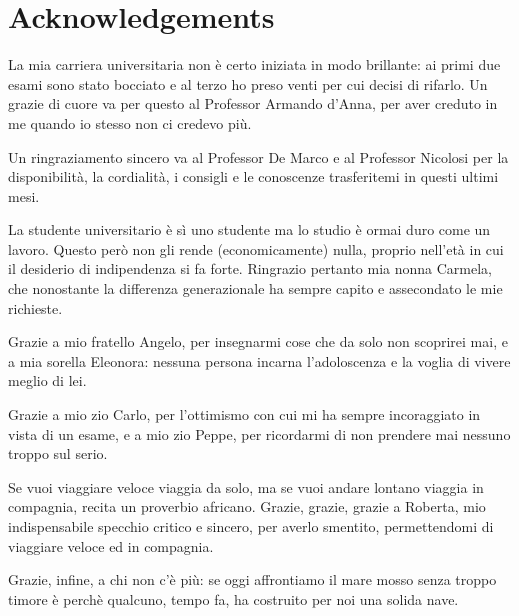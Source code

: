 %
%
%
%
%
\chapter{Acknowledgements}

La mia carriera universitaria non è certo iniziata in modo brillante: ai primi due esami sono stato bocciato e al terzo ho preso venti per cui decisi di rifarlo. Un grazie di cuore va per questo al Professor Armando d'Anna, per aver creduto in me quando io stesso non ci credevo più.

\bigskip
\noindent
Un ringraziamento sincero va al Professor De Marco e al Professor Nicolosi per la disponibilità, la cordialità, i consigli e le conoscenze trasferitemi in questi ultimi mesi.

\bigskip
\noindent
La studente universitario è sì uno studente ma lo studio è ormai duro come un lavoro. Questo però non gli rende (economicamente) nulla, proprio nell'età in cui il desiderio di indipendenza si fa forte. Ringrazio pertanto mia nonna Carmela, che nonostante la differenza generazionale ha sempre capito e assecondato le mie richieste.

\bigskip
\noindent
Grazie a mio fratello Angelo, per insegnarmi cose che da solo non scoprirei mai, e a mia sorella Eleonora: nessuna persona incarna l'adoloscenza e la voglia di vivere meglio di lei.

\bigskip
\noindent
Grazie a mio zio Carlo, per l'ottimismo con cui mi ha sempre incoraggiato in vista di un esame, e a mio zio Peppe, per ricordarmi di non prendere mai nessuno troppo sul serio.

\bigskip
\noindent
Se vuoi viaggiare veloce viaggia da solo, ma se vuoi andare lontano viaggia in compagnia, recita un proverbio africano. Grazie, grazie, grazie a Roberta, mio indispensabile specchio critico e sincero, per averlo smentito, permettendomi di viaggiare veloce ed in compagnia.

\bigskip
\noindent
Grazie, infine, a chi non c'è più: se oggi affrontiamo il mare mosso senza troppo timore è perchè qualcuno, tempo fa, ha costruito per noi una solida nave.

\clearpage

